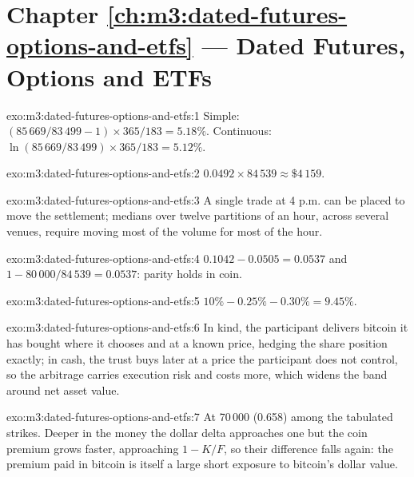 \section*{Chapter \ref{ch:m3:dated-futures-options-and-etfs} --- Dated Futures, Options and ETFs}

\begin{solution}{exo:m3:dated-futures-options-and-etfs:1}
Simple: $(85\,669/83\,499 - 1) \times 365/183 = 5.18\%$. Continuous: $\ln(85\,669/83\,499) \times 365/183 = 5.12\%$.
\end{solution}

\begin{solution}{exo:m3:dated-futures-options-and-etfs:2}
$0.0492 \times 84\,539 \approx \$4\,159$.
\end{solution}

\begin{solution}{exo:m3:dated-futures-options-and-etfs:3}
A single trade at 4 p.m. can be placed to move the settlement; medians over twelve partitions of an hour, across several venues,
require moving most of the volume for most of the hour.
\end{solution}

\begin{solution}{exo:m3:dated-futures-options-and-etfs:4}
$0.1042 - 0.0505 = 0.0537$ and $1 - 80\,000/84\,539 = 0.0537$: parity holds in coin.
\end{solution}

\begin{solution}{exo:m3:dated-futures-options-and-etfs:5}
$10\% - 0.25\% - 0.30\% = 9.45\%$.
\end{solution}

\begin{solution}{exo:m3:dated-futures-options-and-etfs:6}
In kind, the participant delivers bitcoin it has bought where it chooses and at a known price, hedging the share position exactly; in
cash, the trust buys later at a price the participant does not control, so the arbitrage carries execution risk and costs more, which
widens the band around net asset value.
\end{solution}

\begin{solution}{exo:m3:dated-futures-options-and-etfs:7}
At 70\,000 (0.658) among the tabulated strikes. Deeper in the money the dollar delta approaches one but the coin premium grows
faster, approaching $1 - K/F$, so their difference falls again: the premium paid in bitcoin is itself a large short exposure to
bitcoin's dollar value.
\end{solution}

